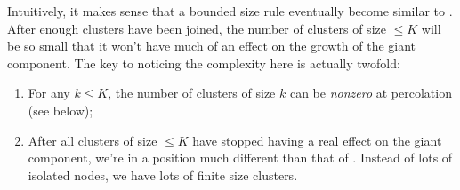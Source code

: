 \documentclass[twoside,10pt]{article}
\begin{document}
Intuitively, it makes sense that a bounded size rule eventually become similar to \ER. After enough clusters have been joined, the number of clusters of size $\leq K$ will be so small that it won't have much of an effect on the growth of the giant component. The key to noticing the complexity here is actually twofold:

\begin{enumerate}
	\item For any $k \leq K$, the number of clusters of size $k$ can be \textit{nonzero} at percolation (see  below);
        \item After all clusters of size $\leq K$ have stopped having a real effect on the giant component, we're in a position much different than that of \ER. Instead of lots of isolated nodes, we have lots of finite size clusters.
\end{enumerate}
\end{document}
